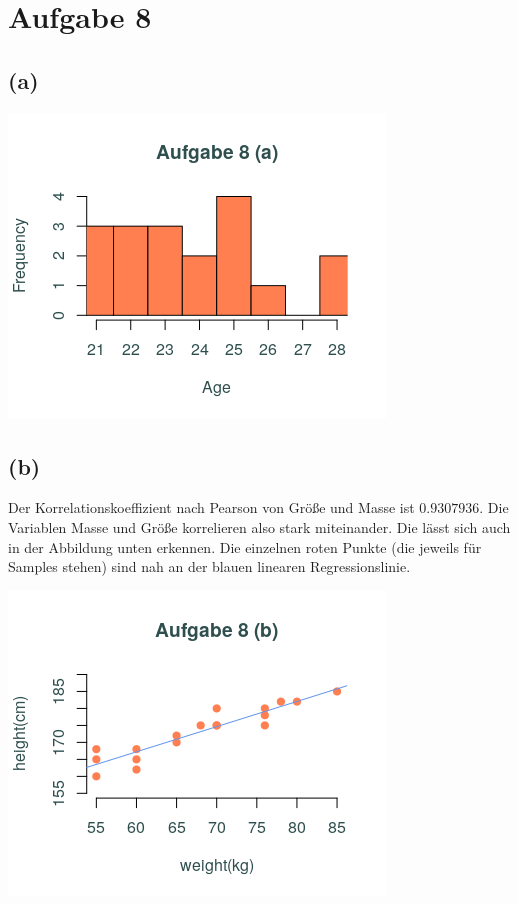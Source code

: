 \documentclass[a4paper]{scrartcl}
\begin{document}
\section*{Aufgabe 8}
\subsection*{(a)}
\begin{center}
	\includegraphics*[scale = 0.5]{aufgabe_8_a.png}
\end{center}


\subsection*{(b)}
Der Korrelationskoeffizient nach Pearson von Größe und Masse ist $0.9307936$. Die Variablen Masse und Größe korrelieren also stark miteinander. Die lässt sich auch in der Abbildung unten erkennen. Die einzelnen roten Punkte (die jeweils für Samples stehen) sind nah an der blauen linearen Regressionslinie.
\begin{center}
	\includegraphics*[scale = 0.5]{aufgabe_8_b.png}
\end{center}
\end{document}
